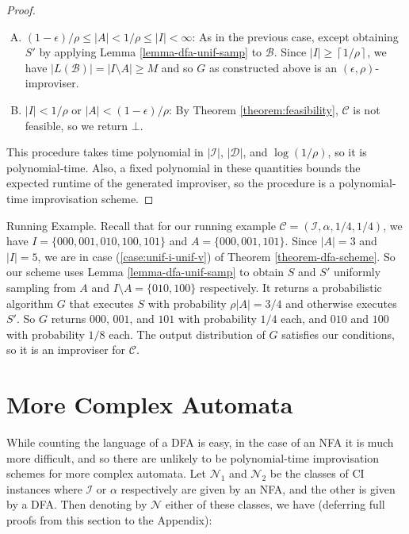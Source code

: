 \documentclass[a4paper,USenglish,numberwithinsect]{lipics}
\theoremstyle{plain}
\theoremstyle{definition}
\newcommand{\ceil}[1]{\left\lceil #1\right\rceil}
\newcommand{\improvs}{I}
\newcommand{\valids}{A}
\begin{document}
\begin{proof}
\begin{enumerate}[(A)]
\item \label{case:unif-i-unif-v} $(1-\epsilon)/\rho \le |\valids| < 1/\rho \le | \improvs | < \infty$: As in the previous case, except obtaining $S'$ by applying Lemma \ref{lemma-dfa-unif-samp} to $\mathcal{B}$. Since $| \improvs | \ge \ceil{1/\rho}$, we have $|L(\mathcal{B})| = | \improvs \setminus \valids | \ge M$ and so $G$ as constructed above is an $(\epsilon, \rho)$-improviser.

\item \label{case:infeasible} $| \improvs | < 1/\rho$ or $|\valids| < (1-\epsilon) / \rho$: By Theorem \ref{theorem:feasibility}, $\mathcal{C}$ is not feasible, so we return $\bot$.
\end{enumerate}

This procedure takes time polynomial in $|\mathcal{\improvs}|$, $|\mathcal{D}|$, and $\log(1/\rho)$, so it is polynomial-time. Also, a fixed polynomial in these quantities bounds the expected runtime of the generated improviser, so the procedure is a polynomial-time improvisation scheme.
\end{proof}

\begin{subparagraph}{Running Example.}
Recall that for our running example $\mathcal{C} = (\mathcal{\improvs}, \alpha, 1/4, 1/4)$, we have $\improvs = \{000, 001, 010, 100, 101\}$ and $\valids = \{000, 001, 101\}$. 
Since $|\valids| = 3$ and $|\improvs| = 5$, we are in case (\ref{case:unif-i-unif-v}) of Theorem \ref{theorem-dfa-scheme}.
So our scheme uses Lemma \ref{lemma-dfa-unif-samp} to obtain $S$ and $S'$ uniformly sampling from $\valids$ and $\improvs \setminus \valids = \{010, 100\}$ respectively.
It returns a probabilistic algorithm $G$ that executes $S$ with probability $\rho |\valids| = 3/4$ and otherwise executes $S'$.
So $G$ returns $000$, $001$, and $101$ with probability $1/4$ each, and $010$ and $100$ with probability $1/8$ each.
The output distribution of $G$ satisfies our conditions, so it is an improviser for $\mathcal{C}$.
\end{subparagraph}

\section{More Complex Automata} \label{section:complex-automata}

While counting the language of a DFA is easy, in the case of an NFA it
is much more difficult, and so there are unlikely to be
polynomial-time improvisation schemes for more complex automata. Let
$\mathcal{N}_1$ and $\mathcal{N}_2$ be the classes of CI instances
where $\mathcal{\improvs}$ or $\alpha$ respectively are given by an
NFA, and the other is given by a DFA. Then denoting by $\mathcal{N}$ 
either of these classes, we have (deferring full proofs from this section to the Appendix): 
\end{document}
